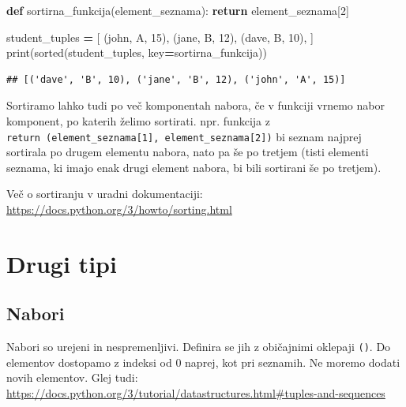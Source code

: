 \documentclass[
]{report}
\newenvironment{Shaded}{\begin{snugshade}}{\end{snugshade}}
\newcommand{\BuiltInTok}[1]{#1}
\newcommand{\ControlFlowTok}[1]{\textcolor[rgb]{0.13,0.29,0.53}{\textbf{#1}}}
\newcommand{\DecValTok}[1]{\textcolor[rgb]{0.00,0.00,0.81}{#1}}
\newcommand{\KeywordTok}[1]{\textcolor[rgb]{0.13,0.29,0.53}{\textbf{#1}}}
\newcommand{\NormalTok}[1]{#1}
\newcommand{\OperatorTok}[1]{\textcolor[rgb]{0.81,0.36,0.00}{\textbf{#1}}}
\newcommand{\StringTok}[1]{\textcolor[rgb]{0.31,0.60,0.02}{#1}}
\begin{document}
\begin{Shaded}
\begin{Highlighting}[]
\KeywordTok{def}\NormalTok{ sortirna\_funkcija(element\_seznama):}
    \ControlFlowTok{return}\NormalTok{ element\_seznama[}\DecValTok{2}\NormalTok{]}

\NormalTok{student\_tuples }\OperatorTok{=}\NormalTok{ [}
\NormalTok{    (}\StringTok{\textquotesingle{}john\textquotesingle{}}\NormalTok{, }\StringTok{\textquotesingle{}A\textquotesingle{}}\NormalTok{, }\DecValTok{15}\NormalTok{),}
\NormalTok{    (}\StringTok{\textquotesingle{}jane\textquotesingle{}}\NormalTok{, }\StringTok{\textquotesingle{}B\textquotesingle{}}\NormalTok{, }\DecValTok{12}\NormalTok{),}
\NormalTok{    (}\StringTok{\textquotesingle{}dave\textquotesingle{}}\NormalTok{, }\StringTok{\textquotesingle{}B\textquotesingle{}}\NormalTok{, }\DecValTok{10}\NormalTok{),}
\NormalTok{]}
\BuiltInTok{print}\NormalTok{(}\BuiltInTok{sorted}\NormalTok{(student\_tuples, key}\OperatorTok{=}\NormalTok{sortirna\_funkcija))}
\end{Highlighting}
\end{Shaded}

\begin{verbatim}
## [('dave', 'B', 10), ('jane', 'B', 12), ('john', 'A', 15)]
\end{verbatim}

Sortiramo lahko tudi po več komponentah nabora, če v funkciji vrnemo nabor komponent, po katerih želimo sortirati. npr. funkcija z \texttt{return\ (element\_seznama{[}1{]},\ element\_seznama{[}2{]})} bi seznam najprej sortirala po drugem elementu nabora, nato pa še po tretjem (tisti elementi seznama, ki imajo enak drugi element nabora, bi bili sortirani še po tretjem).

Več o sortiranju v uradni dokumentaciji: \url{https://docs.python.org/3/howto/sorting.html}

\hypertarget{drugi-tipi}{%
\section{Drugi tipi}\label{drugi-tipi}}

\hypertarget{nabori}{%
\subsection{Nabori}\label{nabori}}

Nabori so urejeni in nespremenljivi. Definira se jih z običajnimi oklepaji \texttt{()}. Do elementov dostopamo z indeksi od 0 naprej, kot pri seznamih. Ne moremo dodati novih elementov. Glej tudi: \url{https://docs.python.org/3/tutorial/datastructures.html\#tuples-and-sequences}
\end{document}
